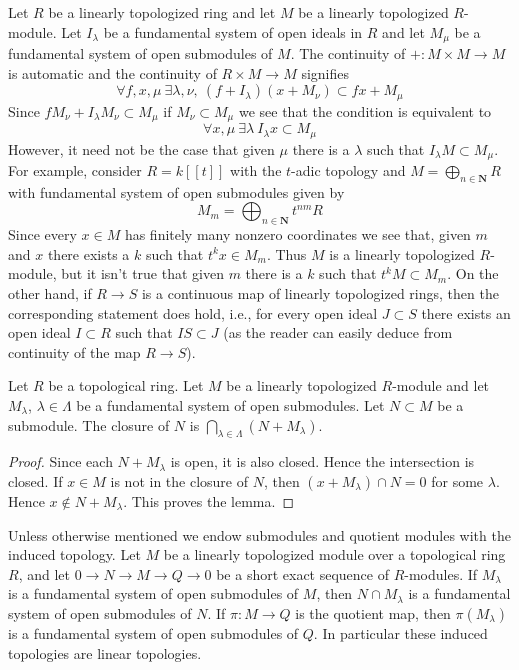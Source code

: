 \begin{example}
\label{example-what-does-it-mean}
Let $R$ be a linearly topologized ring and let $M$ be a linearly
topologized $R$-module. Let $I_\lambda$ be a fundamental system of
open ideals in $R$ and let $M_\mu$ be a fundamental system of
open submodules of $M$. The continuity of $+ : M \times M \to M$
is automatic and the continuity of $R \times M \to M$ signifies
$$
\forall f, x, \mu\ \exists \lambda, \nu,\ (f + I_\lambda)(x + M_\nu)
\subset fx + M_\mu
$$
Since $fM_\nu + I_\lambda M_\nu \subset M_\mu$ if
$M_\nu \subset M_\mu$ we see that the condition is equivalent to
$$
\forall x, \mu\ \exists \lambda\ I_\lambda x \subset M_\mu
$$
However, it need not be the case that given $\mu$ there is a $\lambda$
such that $I_\lambda M \subset M_\mu$. For example, consider
$R = k[[t]]$ with the $t$-adic topology and
$M = \bigoplus_{n \in \mathbf{N}} R$ with fundamental system of
open submodules given by
$$
M_m = \bigoplus\nolimits_{n \in \mathbf{N}} t^{nm}R
$$
Since every $x \in M$ has finitely many nonzero coordinates we see
that, given $m$ and $x$ there exists a $k$ such that $t^k x \in M_m$.
Thus $M$ is a linearly topologized $R$-module, but it isn't true
that given $m$ there is a $k$ such that $t^kM \subset M_m$.
On the other hand, if $R \to S$ is a continuous map of linearly
topologized rings, then the corresponding statement does hold, i.e.,
for every open ideal $J \subset S$ there exists an open ideal
$I \subset R$ such that $IS \subset J$ (as the reader can easily
deduce from continuity of the map $R \to S$).
\end{example}

\begin{lemma}
\label{lemma-closed}
Let $R$ be a topological ring. Let $M$ be a linearly topologized
$R$-module and let $M_\lambda$, $\lambda \in \Lambda$ be a fundamental
system of open submodules. Let $N \subset M$ be a submodule.
The closure of $N$ is $\bigcap_{\lambda \in \Lambda} (N + M_\lambda)$.
\end{lemma}

\begin{proof}
Since each $N + M_\lambda$ is open, it is also closed. Hence the
intersection is closed. If $x \in M$ is not in the closure of $N$,
then $(x + M_\lambda) \cap N = 0$ for some $\lambda$. Hence
$x \not \in N + M_\lambda$. This proves the lemma.
\end{proof}

\noindent
Unless otherwise mentioned we endow submodules and quotient modules
with the induced topology. Let $M$ be a linearly topologized module
over a topological ring $R$, and let $0 \to N \to M \to Q \to 0$
be a short exact sequence of $R$-modules. If $M_\lambda$ is a
fundamental system of open submodules of $M$, then
$N \cap M_\lambda$ is a fundamental system of open submodules of $N$.
If $\pi : M \to Q$ is the quotient map, then $\pi(M_\lambda)$ is a
fundamental system of open submodules of $Q$. In particular these induced
topologies are linear topologies.

